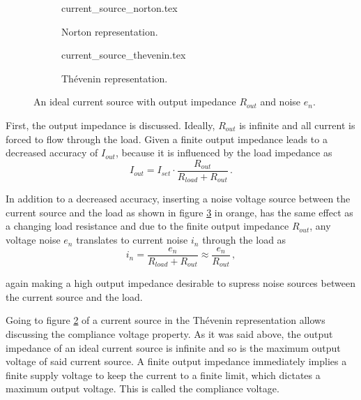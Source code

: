 \begin{figure}[ht]
    \centering
    \begin{subfigure}{0.4\linewidth}
        \centering
        {current_source_norton.tex}
        \caption{Norton representation.}
        \label{fig:ideal_current_source_norton}
    \end{subfigure}
    \begin{subfigure}{0.4\linewidth}
        \centering
        {current_source_thevenin.tex}
        \caption{Thévenin representation.}
        \label{fig:ideal_current_source_thevenin}
    \end{subfigure}
    \caption{An ideal current source with output impedance $R_{out}$ and noise $e_n$.}
    \label{fig:ideal_current_source}
\end{figure}

First, the output impedance is discussed. Ideally, $R_{out}$ is infinite and all current is forced to flow through the load. Given a finite output impedance leads to a decreased accuracy of $I_{out}$, because it is influenced by the load impedance as
\begin{equation}
    I_{out} = I_{set} \cdot \frac{R_{out}}{R_{load} + R_{out}} \, .
\end{equation}

In addition to a decreased accuracy, inserting a noise voltage source between the current source and the load as shown in figure \ref{fig:ideal_current_source} in orange, has the same effect as a changing load resistance and due to the finite output impedance $R_{out}$, any voltage noise $e_n$ translates to current noise $i_n$ through the load as
\begin{equation}
    i_n = \frac{e_n}{R_{load} + R_{out}} \approx \frac{e_n}{R_{out}} \, ,
\end{equation}

again making a high output impedance desirable to supress noise sources between the current source and the load.

Going to figure \ref{fig:ideal_current_source_thevenin} of a current source in the Thévenin representation allows discussing the compliance voltage property. As it was said above, the output impedance of an ideal current source is infinite and so is the maximum output voltage of said current source. A finite output impedance immediately implies a finite supply voltage to keep the current to a finite limit, which dictates a maximum output voltage. This is called the compliance voltage.


